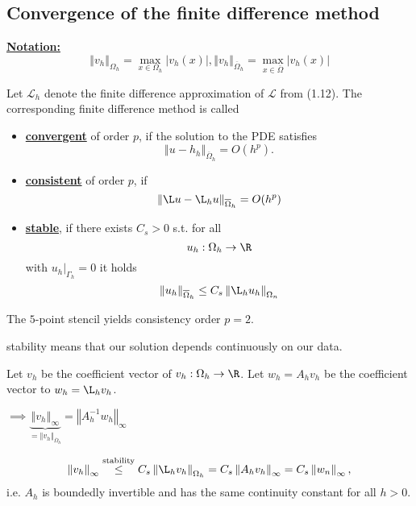 

\subsection{Convergence of the finite difference method}

\underline{\textbf{Notation:}} \[\left\Vert v_h \right\Vert_{\Omega_h}=\max_{x\in\Omega_h}|v_h(x)|,\left\Vert v_h \right\Vert_{\overline{\Omega}_h}=\max_{x\in\overline{\Omega}}|v_h(x)|\]

\begin{definition}
    Let $\mathcal{L}_h$ denote the finite difference approximation of $\mathcal{L}$ from (1.12). The corresponding finite difference method 
    is called 
    \begin{itemize}
        \item \underline{\textbf{convergent}} of order $p$, if the solution to the PDE satisfies \[\left\Vert u-h_h \right\Vert_{\overline{\Omega}_h}=O(h^p).\]
        \item \underline{\textbf{consistent}} of order $p$, if \[\left\Vert \L u -\L_hu \right\Vert_{\overline{\Omega}_h}=O(h^p)\]
        \item \underline{\textbf{stable}}, if there exists $C_s>0$ s.t. for all \[u_h:\Omega_h\to \R\] with $u_h|_{\Gamma_h}=0$ it holds \[\left\Vert u_h \right\Vert_{\overline{\Omega}_h}\leq C_s \left\Vert \L_h u_h \right\Vert_{\Omega_n}\]
    \end{itemize}
\end{definition}

\begin{remark}
    The $5$-point stencil yields consistency order $p=2$.
\end{remark}

\begin{aremark}
    stability means that our solution depends continuously on our data.
\end{aremark}

\begin{remark}
    Let $v_h$ be the coefficient vector of $v_h:\Omega_h\to\R$. Let $w_h=A_h v_h$ be the coefficient vector to $w_h=\L_h v_h$.

    $\implies \underbrace{\left\Vert v_h \right\Vert_{\infty}}_{=\left\Vert v_h \right\Vert_{\overline{\Omega}_h}}=\left\Vert A_h^{-1} w_h \right\Vert_{\infty}$
    
    \begin{align*}
        \left\Vert v_h \right\Vert_{\infty}\stackrel{\text{stability}}{\leq} C_s \left\Vert \L_h v_h \right\Vert_{\Omega_h}=C_s \left\Vert A_h v_h  \right\Vert_{\infty} = C_s \left\Vert w_n \right\Vert_\infty,
    \end{align*}
    i.e. $A_h$ is boundedly invertible and has the same continuity constant for all $h>0$.
\end{remark}

